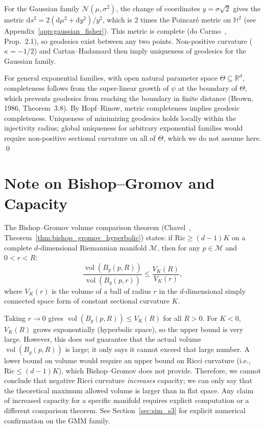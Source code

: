 \documentclass[a4paper,fleqn]{cas-dc}
\DeclareMathOperator{\vol}{vol}
\newcommand{\R}{\mathbb{R}}
\newcommand{\calM}{\mathcal{M}}
\begin{document}
For the Gaussian family $\mathcal{N}(\mu,\sigma^2)$, the change of
coordinates $y = \sigma\sqrt{2}$ gives the metric
$\mathrm{d}s^2 = 2(\mathrm{d}\mu^2 + \mathrm{d}y^2)/y^2$, which is
$2$ times the Poincar\'{e} metric on $\mathbb{H}^2$ (see
Appendix~\ref{app:gaussian_fisher}).  This metric is complete (do
Carmo~\cite{do2002riemannian}, Prop.~2.1), so geodesics exist
between any two points.  Non-positive curvature ($\kappa=-1/2$)
and Cartan--Hadamard then imply uniqueness of geodesics for the
Gaussian family.

For general exponential families, with open natural parameter space
$\Theta \subseteq \R^d$, completeness follows from the super-linear
growth of $\psi$ at the boundary of $\Theta$, which prevents geodesics
from reaching the boundary in finite distance (Brown, 1986,
Theorem~3.8).  By Hopf--Rinow, metric completeness implies geodesic
completeness.  Uniqueness of minimizing geodesics holds locally within
the injectivity radius; global uniqueness for arbitrary exponential
families would require non-positive sectional curvature on all of
$\Theta$, which we do not assume here.  \qed

\section{Note on Bishop–Gromov and Capacity}
\label{app:bishop_gromov_corrected}

The Bishop–Gromov volume comparison theorem (Chavel~\cite{chavel2006riemannian},
Theorem~\ref{thm:bishop_gromov_hyperbolic}) states: if $\mathrm{Ric} \geq (d-1)K$ on a complete
$d$-dimensional Riemannian manifold $\calM$, then for any $p \in \calM$
and $0 < r < R$:
\[
  \frac{\vol(B_g(p, R))}{\vol(B_g(p, r))} \leq \frac{V_K(R)}{V_K(r)},
\]
where $V_K(r)$ is the volume of a ball of radius $r$ in the
$d$-dimensional simply connected space form of constant sectional
curvature $K$.

Taking $r \to 0$ gives $\vol(B_g(p,R)) \leq V_K(R)$ for all $R>0$.
For $K<0$, $V_K(R)$ grows exponentially (hyperbolic space), so the
upper bound is very large.  However, this does \emph{not} guarantee that
the actual volume $\vol(B_g(p,R))$ is large; it only says it cannot
exceed that large number.  A lower bound on volume would require an
upper bound on Ricci curvature (i.e., $\mathrm{Ric} \leq (d-1)K$),
which Bishop–Gromov does not provide.  Therefore, we cannot conclude
that negative Ricci curvature \emph{increases} capacity; we can only say
that the theoretical maximum allowed volume is larger than in flat space.
Any claim of increased capacity for a specific manifold requires
explicit computation or a different comparison theorem.
See Section~\ref{sec:sim_s3} for explicit numerical confirmation on the GMM family.
\end{document}
